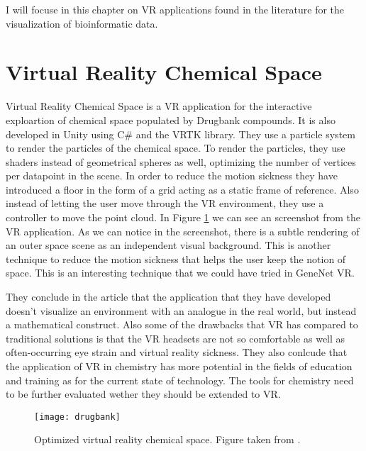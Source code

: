 I will focuse in this chapter on VR applications found in the literature for the visualization of bioinformatic data.

\section{Virtual Reality Chemical Space}
Virtual Reality Chemical Space is a VR application for the interactive exploartion of chemical space populated by Drugbank compounds\cite{drugbank}. It is also developed in Unity using C\# and the VRTK library. They use a particle system to render the particles of the chemical space. To render the particles, they use shaders instead of geometrical spheres as well, optimizing the number of vertices per datapoint in the scene. In order to reduce the motion sickness they have introduced a floor in the form of a grid acting as a static frame of reference. Also instead of letting the user move through the VR environment, they use a controller to move the point cloud. In Figure \ref{fig:drugbank} we can see an screenshot from the VR application. As we can notice in the screenshot, there is a subtle rendering of an outer space scene as an independent visual background. This is another technique to reduce the motion sickness that helps the user keep the notion of space. This is an interesting technique that we could have tried in GeneNet VR.

They conclude in the article that the application that they have developed doesn't visualize an environment with an analogue in the real world, but instead a mathematical construct. Also some of the drawbacks that VR has compared to traditional solutions is that the VR headsets are not so comfortable as well as often-occurring eye strain and virtual reality sickness. They also conlcude that the application of VR in chemistry has more potential in the fields of education and training as for the current state of technology. The tools for chemistry need to be further evaluated wether they should be extended to VR.

\begin{figure}[h!]
    \centering%
    \texttt{[image: drugbank]}
    \caption{Optimized virtual reality chemical space. Figure taken from \cite{drugbank}.}
    \label{fig:drugbank}
\end{figure}%

